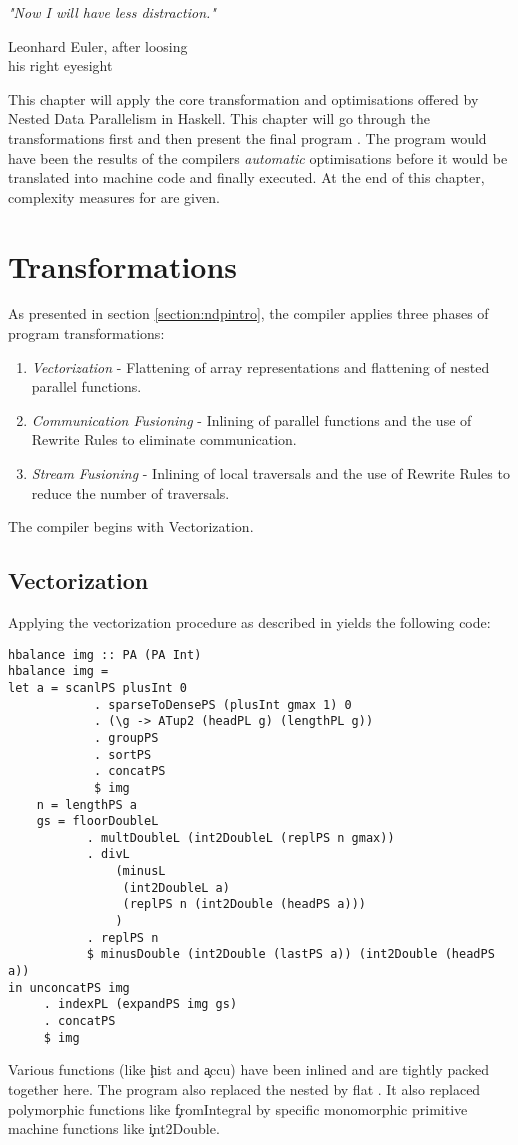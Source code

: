 \epigraph{\emph{
"Now I will have less distraction."
}}{
Leonhard Euler, after loosing \\ his right eyesight
}


This chapter will apply the core transformation and optimisations
offered by Nested Data Parallelism in Haskell.
This chapter will go through the transformations first and then present the
final program \ndpv. The program would have been the results of the compilers \textit{automatic}
optimisations before it would be translated into machine code and finally executed.
At the end of this chapter, complexity measures for \ndpv are given.


\section{Transformations}
  As presented in section \ref{section:ndpintro}, the compiler applies
  three phases of program transformations:
  \begin{enumerate}
    \item \emph{Vectorization} - Flattening of array representations
      and flattening of nested parallel functions.
    \item \emph{Communication Fusioning} - Inlining of parallel
      functions and the use of Rewrite Rules
      to eliminate communication.
    \item \emph{Stream Fusioning} - Inlining of local traversals and
      the use of Rewrite Rules to reduce the number of traversals.
  \end{enumerate}
  
  The compiler begins with Vectorization.
  
  \subsection{Vectorization}
    Applying the vectorization procedure as described in \cite{Harness2008} yields the following code:
    \begin{lstlisting}
hbalance img :: PA (PA Int)
hbalance img = 
let a = scanlPS plusInt 0
            . sparseToDensePS (plusInt gmax 1) 0
            . (\g -> ATup2 (headPL g) (lengthPL g))
            . groupPS
            . sortPS
            . concatPS
            $ img
    n = lengthPS a
    gs = floorDoubleL
           . multDoubleL (int2DoubleL (replPS n gmax))
           . divL
               (minusL
                (int2DoubleL a)
                (replPS n (int2Double (headPS a)))
               )
           . replPS n
           $ minusDouble (int2Double (lastPS a)) (int2Double (headPS a))
in unconcatPS img
     . indexPL (expandPS img gs)
     . concatPS
     $ img
    \end{lstlisting} %
    Various functions (like \c{hist} and \c{accu}) have been inlined and are tightly packed together here.
    The program also replaced the nested \pan by flat \pav.
    It also replaced polymorphic functions like \c{fromIntegral}
    by specific monomorphic primitive machine functions like \c{int2Double}.
    

